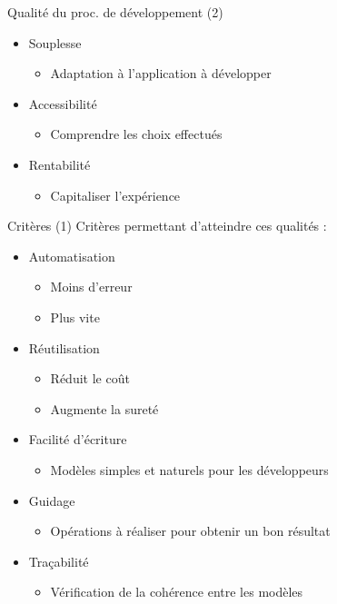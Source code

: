 \documentclass[14pt]{beamer}
\begin{document}
\begin{framentitle}{Qualité du proc. de développement (2)}
    \begin{itemize}
        \item Souplesse
            \begin{itemize}
                \item Adaptation à l'application à développer
            \end{itemize}
        \item Accessibilité
            \begin{itemize}
                \item Comprendre les choix effectués
            \end{itemize}
        \item Rentabilité
            \begin{itemize}
                \item Capitaliser l'expérience
            \end{itemize}
    \end{itemize}
\end{framentitle}

\begin{framentitle}{Critères (1)}
    Critères permettant d'atteindre ces qualités :
    \begin{itemize}
        \item Automatisation
            \begin{itemize}
                \item Moins d'erreur
                \item Plus vite
            \end{itemize}
        \item Réutilisation
            \begin{itemize}
                \item Réduit le coût
                \item Augmente la sureté
            \end{itemize}
        \item Facilité d'écriture
            \begin{itemize}
                \item Modèles simples et naturels pour les développeurs
            \end{itemize}
        \item Guidage
            \begin{itemize}
                \item Opérations à réaliser pour obtenir un bon résultat
            \end{itemize}
        \item Traçabilité
            \begin{itemize}
                \item Vérification de la cohérence entre les modèles
            \end{itemize}
    \end{itemize}
\end{framentitle}
\end{document}
